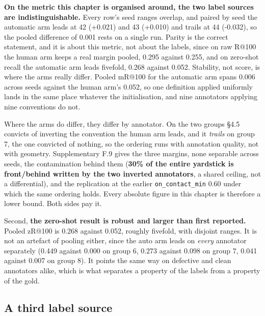 \textbf{On the metric this chapter is organised around, the two label sources are indistinguishable.} Every row's seed ranges overlap, and paired by seed the automatic arm leads at 42 (+0.021) and 43 (+0.010) and trails at 44 (-0.032), so the pooled difference of 0.001 rests on a single run. Parity is the correct statement, and it is about this metric, not about the labels, since on raw R@100 the human arm keeps a real margin pooled, 0.295 against 0.255, and on zero-shot recall the automatic arm leads fivefold, 0.268 against 0.052. Stability, not score, is where the arms really differ. Pooled mR@100 for the automatic arm spans 0.006 across seeds against the human arm's 0.052, so one definition applied uniformly lands in the same place whatever the initialisation, and nine annotators applying nine conventions do not.

Where the arms do differ, they differ by annotator. On the two groups \S{}4.5 convicts of inverting the convention the human arm leads, and it \textit{trails} on group 7, the one convicted of nothing, so the ordering runs with annotation quality, not with geometry. Supplementary F.9 gives the three margins, none separable across seeds, the contamination behind them (\textbf{30\% of the entire yardstick is front/behind written by the two inverted annotators}, a shared ceiling, not a differential), and the replication at the earlier \texttt{on\_\allowbreak{}contact\_\allowbreak{}min} 0.60 under which the same ordering holds. Every absolute figure in this chapter is therefore a lower bound. Both sides pay it.

Second, \textbf{the zero-shot result is robust and larger than first reported.} Pooled zR@100 is 0.268 against 0.052, roughly fivefold, with disjoint ranges. It is not an artefact of pooling either, since the auto arm leads on \textit{every} annotator separately (0.449 against 0.000 on group 6, 0.273 against 0.098 on group 7, 0.041 against 0.007 on group 8). It points the same way on defective and clean annotators alike, which is what separates a property of the labels from a property of the gold.

\subsection{A third label source}

